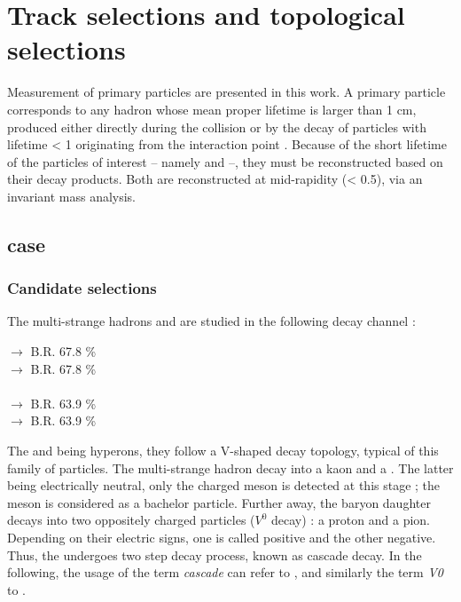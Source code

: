 \section{Track selections and topological selections}
\label{sec:Section04}


Measurement of primary particles are presented in this work. A primary particle corresponds to any hadron whose mean proper lifetime is larger than 1 cm, produced either directly during the collision or by the decay of particles with lifetime \cTau < 1 \cm originating from the interaction point \cite{noauthor_alice_2017}. Because of the short lifetime of the particles of interest -- namely \rmOmega and \rmPhiMes --, they must be reconstructed based on their decay products. Both are reconstructed at mid-rapidity (\absrap < 0.5), via an invariant mass analysis.

\subsection{\rmOmega case}
\label{sec:Section04.a-}

\subsubsection{Candidate selections}

The multi-strange hadrons \rmOmegaM and \rmAomegaP are studied in the following decay channel :

\rmOmegaM [$sss$] $\rightarrow$ \rmLambda [$u d s$] \Kminus [$\bar{d} s$]  \qquad \textsc{B.R. 67.8 \%}\\
 $\rightarrow$  \Kplus [$u\bar{s}$] \qquad \textsc{B.R. 67.8 \%} \\
\\
\rmLambda [$u d s$] $\rightarrow$ \proton [$uud$] \piMinus [$\bar{u} d$] \qquad \textsc{B.R. 63.9 \%}\\
 $\rightarrow$  \piPlus [$u \bar{d}$] \qquad \textsc{B.R. 63.9 \%}

The \rmLambda and \rmOmega being hyperons, they follow a V-shaped decay topology, typical of this family of particles. The multi-strange hadron decay into a kaon and a \rmLambda. The latter being electrically neutral, only the charged meson is detected at this stage ; the meson is considered as a bachelor particle. Further away, the baryon daughter decays into two oppositely charged particles ($V^0$ decay) : a proton and a pion. Depending on their electric signs, one is called positive and the other negative. Thus, the \rmOmega undergoes two step decay process, known as cascade decay. In the following, the usage of the term \textit{cascade} can refer to \rmOmega, and similarly the term \textit{V0} to \rmLambda.

